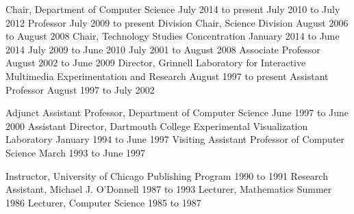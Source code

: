 

\begin{cventries}



    \cventryB
      {Chair, Department of Computer Science}
      {July 2014 to present}
    \cventryB
      {}
      {July 2010 to July 2012}
    \cventryB
      {Professor}
      {July 2009 to present}
    \cventryB
      {Division Chair, Science Division}
      {August 2006 to August 2008}
    \cventryB
      {Chair, Technology Studies Concentration}
      {January 2014 to June 2014}
    \cventryB
      {}
      {July 2009 to June 2010}
    \cventryB
      {}
      {July 2001 to August 2008}
    \cventryB
      {Associate Professor}
      {August 2002 to June 2009}
    \cventryB
      {Director, Grinnell Laboratory for Interactive Multimedia
       Experimentation and Research}
      {August 1997 to present}
    \cventryB
      {Assistant Professor}
      {August 1997 to July 2002}

  \vspace{2mm}

    \cventryB
      {Adjunct Assistant Professor, Department of Computer Science}
      {June 1997 to June 2000}
    \cventryB
      {Assistant Director, Dartmouth College Experimental
       Visualization Laboratory}
      {January 1994 to June 1997}
    \cventryB
      {Visiting Assistant Professor of Computer Science}
      {March 1993 to June 1997}

  \vspace{2mm}

    \cventryB
      {Instructor, University of Chicago Publishing Program}
      {1990 to 1991}
    \cventryB
      {Research Assistant, Michael J. O'Donnell}
      {1987 to 1993}
    \cventryB
      {Lecturer, Mathematics}
      {Summer 1986}
    \cventryB
      {Lecturer, Computer Science}
      {1985 to 1987}

\end{cventries}
